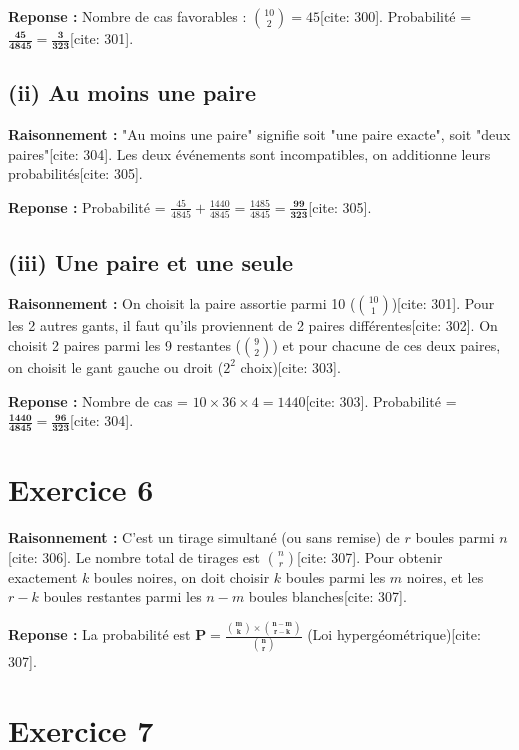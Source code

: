 \documentclass[11pt,a4paper]{article}
\begin{document}
\textbf{Reponse :} Nombre de cas favorables : $\binom{10}{2} = 45$[cite: 300]. Probabilité = $\mathbf{\frac{45}{4845} = \frac{3}{323}}$[cite: 301].

\subsection*{(ii) Au moins une paire}

\textbf{Raisonnement :} "Au moins une paire" signifie soit "une paire exacte", soit "deux paires"[cite: 304]. Les deux événements sont incompatibles, on additionne leurs probabilités[cite: 305].

\textbf{Reponse :} Probabilité = $\frac{45}{4845} + \frac{1440}{4845} = \frac{1485}{4845} = \mathbf{\frac{99}{323}}$[cite: 305].

\subsection*{(iii) Une paire et une seule}

\textbf{Raisonnement :} On choisit la paire assortie parmi 10 ($\binom{10}{1}$)[cite: 301]. Pour les 2 autres gants, il faut qu'ils proviennent de 2 paires différentes[cite: 302]. On choisit 2 paires parmi les 9 restantes ($\binom{9}{2}$) et pour chacune de ces deux paires, on choisit le gant gauche ou droit ($2^2$ choix)[cite: 303].

\textbf{Reponse :} Nombre de cas = $10 \times 36 \times 4 = 1440$[cite: 303]. Probabilité = $\mathbf{\frac{1440}{4845} = \frac{96}{323}}$[cite: 304].

\hrulefill

\section*{Exercice 6}

\textbf{Raisonnement :} C'est un tirage simultané (ou sans remise) de $r$ boules parmi $n$[cite: 306]. Le nombre total de tirages est $\binom{n}{r}$[cite: 307]. Pour obtenir exactement $k$ boules noires, on doit choisir $k$ boules parmi les $m$ noires, et les $r-k$ boules restantes parmi les $n-m$ boules blanches[cite: 307].

\textbf{Reponse :} La probabilité est $\mathbf{P = \frac{\binom{m}{k} \times \binom{n-m}{r-k}}{\binom{n}{r}}}$ (Loi hypergéométrique)[cite: 307].

\hrulefill

\section*{Exercice 7}
\end{document}
